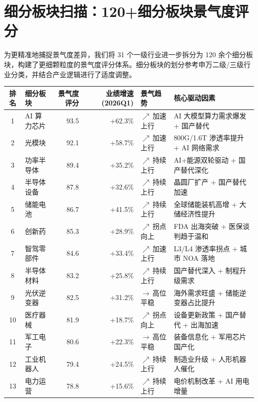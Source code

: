 \section{细分板块扫描：120+细分板块景气度评分}

为更精准地捕捉景气度差异，我们将 31 个一级行业进一步拆分为 120 余个细分板块，构建了更细颗粒度的景气度评分体系。细分板块的划分参考申万二级/三级行业分类，并结合产业逻辑进行了适度调整。

\begin{exhibitbox}
\centering
\small
\renewcommand{\arraystretch}{1.2}
\renewcommand{\tabularxcolumn}[1]{m{#1}}
\begin{tabularx}{\textwidth}{@{}c l r r m{2.2cm} X@{}}
\toprule
\textbf{排名} & \textbf{细分板块} & \textbf{景气度评分} & \textbf{业绩增速 (2026Q1)} & \textbf{景气趋势} & \textbf{核心驱动因素} \\
\midrule
1 & AI 算力芯片 & 93.5 & +62.3\% & $\nearrow\,$加速上行 & AI 大模型算力需求爆发 + 国产替代 \\
2 & 光模块 & 92.1 & +58.7\% & $\nearrow\,$加速上行 & 800G/1.6T 渗透率提升 + AI 网络需求 \\
3 & 功率半导体 & 89.4 & +35.2\% & $\nearrow\,$持续上行 & AI+能源双轮驱动 + 国产替代深化 \\
4 & 半导体设备 & 87.8 & +32.6\% & $\nearrow\,$持续上行 & 晶圆厂扩产 + 国产替代加速 \\
5 & 储能电池 & 86.7 & +41.5\% & $\nearrow\,$持续上行 & 全球储能装机高增 + 大储经济性提升 \\
6 & 创新药 & 85.3 & +28.9\% & $\nearrow\,$拐点向上 & FDA 出海突破 + 医保谈判趋于温和 \\
7 & 智驾零部件 & 84.6 & +33.4\% & $\nearrow\,$加速上行 & L3/L4 渗透率拐点 + 城市 NOA 落地 \\
8 & 半导体材料 & 83.2 & +25.8\% & $\nearrow\,$持续上行 & 国产替代深入 + 制程升级需求 \\
9 & 光伏逆变器 & 82.5 & +31.2\% & $\rightarrow\,$高位平稳 & 海外需求旺盛 + 储能逆变器占比提升 \\
10 & 医疗器械 & 81.9 & +18.7\% & $\nearrow\,$拐点向上 & 设备更新政策 + 国产替代 + 出海加速 \\
11 & 军工电子 & 80.6 & +22.3\% & $\rightarrow\,$高位平稳 & 装备信息化 + 军用芯片国产化 \\
12 & 工业机器人 & 79.4 & +24.5\% & $\nearrow\,$持续上行 & 制造业升级 + 人形机器人催化 \\
13 & 电力运营 & 78.8 & +15.6\% & $\nearrow\,$持续上行 & 电价机制改革 + AI 用电增量 \\

\end{tabularx}
\end{exhibitbox}
